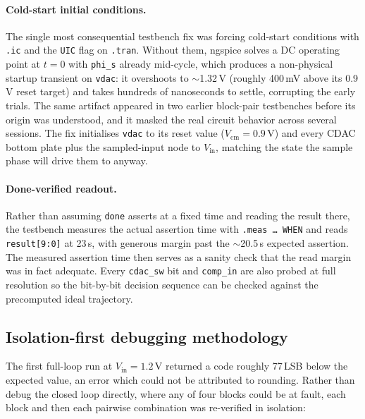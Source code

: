 \documentclass[12pt, a4paper]{article}
\begin{document}
\paragraph{Cold-start initial conditions.} The single most consequential
testbench fix was forcing cold-start conditions with \texttt{.ic} and the
\texttt{UIC} flag on \texttt{.tran}. Without them, ngspice solves a DC
operating point at $t=0$ with \texttt{phi\_s} already mid-cycle, which
produces a non-physical startup transient on \texttt{vdac}: it overshoots
to $\sim$1.32\,V (roughly 400\,mV above its 0.9\,V reset target) and takes
hundreds of nanoseconds to settle, corrupting the early trials. The same
artifact appeared in two earlier block-pair testbenches before its origin
was understood, and it masked the real circuit behavior across several
sessions. The fix initialises \texttt{vdac} to its reset value
($V_\mathrm{cm}=0.9$\,V) and every CDAC bottom plate plus the sampled-input
node to $V_\mathrm{in}$, matching the state the sample phase will drive
them to anyway. 

\paragraph{Done-verified readout.} Rather than assuming \texttt{done}
asserts at a fixed time and reading the result there, the testbench
measures the actual assertion time with \texttt{.meas\ \dots\ WHEN} and
reads \texttt{result[9:0]} at 23\,\textmu s, with generous margin past the
$\sim$20.5\,\textmu s expected assertion. The measured assertion time then
serves as a sanity check that the read margin was in fact adequate. Every
\texttt{cdac\_sw} bit and \texttt{comp\_in} are also probed at full
resolution so the bit-by-bit decision sequence can be checked against the
precomputed ideal trajectory.

\subsection{Isolation-first debugging methodology}
\label{subsection:isolation}

The first full-loop run at $V_\mathrm{in}=1.2$\,V returned a code roughly
77\,LSB below the expected value, an error which could not be attributed to rounding. Rather than debug the closed loop directly, where any of four blocks could
be at fault, each block and then each pairwise combination was re-verified
in isolation:
\end{document}
